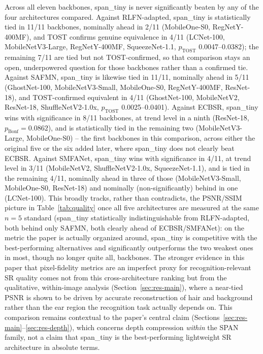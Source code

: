 \documentclass[11pt]{article}
\begin{document}
Across all eleven backbones, span\_tiny is never significantly beaten by any of the four architectures compared. Against RLFN-adapted, span\_tiny is statistically tied in 11/11 backbones, nominally ahead in 2/11 (MobileOne-S0, RegNetY-400MF), and TOST confirms genuine equivalence in 4/11 (LCNet-100, MobileNetV3-Large, RegNetY-400MF, SqueezeNet-1.1, $p_{\text{TOST}}$ 0.0047--0.0382); the remaining 7/11 are tied but not TOST-confirmed, so that comparison stays an open, underpowered question for those backbones rather than a confirmed tie. Against SAFMN, span\_tiny is likewise tied in 11/11, nominally ahead in 5/11 (GhostNet-100, MobileNetV3-Small, MobileOne-S0, RegNetY-400MF, ResNet-18), and TOST-confirmed equivalent in 4/11 (GhostNet-100, MobileNetV2, ResNet-18, ShuffleNetV2-1.0x, $p_{\text{TOST}}$ 0.0025--0.0401). Against ECBSR, span\_tiny wins with significance in 8/11 backbones, at trend level in a ninth (ResNet-18, $p_{\text{Bonf}}{=}0.0862$), and is statistically tied in the remaining two (MobileNetV3-Large, MobileOne-S0) -- the first backbones in this comparison, across either the original five or the six added later, where span\_tiny does not clearly beat ECBSR. Against SMFANet, span\_tiny wins with significance in 4/11, at trend level in 3/11 (MobileNetV2, ShuffleNetV2-1.0x, SqueezeNet-1.1), and is tied in the remaining 4/11, nominally ahead in three of those (MobileNetV3-Small, MobileOne-S0, ResNet-18) and nominally (non-significantly) behind in one (LCNet-100). This broadly tracks, rather than contradicts, the PSNR/SSIM picture in Table~\ref{tab:quality} once all five architectures are measured at the same $n=5$ standard (span\_tiny statistically indistinguishable from RLFN-adapted, both behind only SAFMN, both clearly ahead of ECBSR/SMFANet): on the metric the paper is actually organized around, span\_tiny is competitive with the best-performing alternatives and significantly outperforms the two weakest ones in most, though no longer quite all, backbones. The stronger evidence in this paper that pixel-fidelity metrics are an imperfect proxy for recognition-relevant SR quality comes not from this cross-architecture ranking but from the qualitative, within-image analysis (Section~\ref{sec:res-main}), where a near-tied PSNR is shown to be driven by accurate reconstruction of hair and background rather than the ear region the recognition task actually depends on. This comparison remains contextual to the paper's central claim (Sections~\ref{sec:res-main}--\ref{sec:res-depth}), which concerns depth compression \emph{within} the SPAN family, not a claim that span\_tiny is the best-performing lightweight SR architecture in absolute terms.
\end{document}
